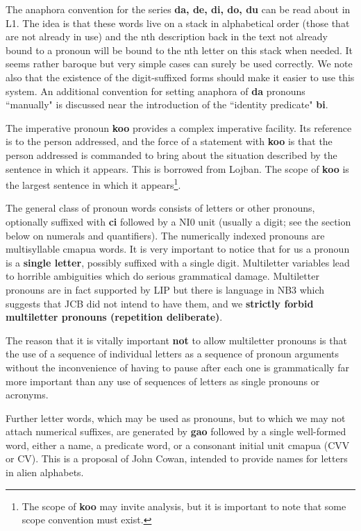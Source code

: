 \documentclass[12pt]{book}
\begin{document}
The anaphora convention for the series {\bf da, de, di, do, du} can be read about in L1.  The idea is that these words live on a stack in alphabetical order (those that are not already in use) and the nth description back in the text not already bound to a pronoun will be bound to the nth letter on this stack when needed.   It seems rather baroque but very simple cases can surely be used correctly.  We note also that the existence of the digit-suffixed forms should make it easier to use this system.  An additional convention for setting anaphora of {\bf da} pronouns ``manually" is discussed near the introduction of the ``identity predicate" {\bf bi}.

The imperative pronoun {\bf koo} provides a complex imperative facility.  Its reference is to the person addressed, and the force of a statement with {\bf koo} is that the person addressed is commanded to bring about the situation described by the sentence in which it appears.  This is borrowed from Lojban.  The scope of {\bf koo} is the largest sentence in which it appears\footnote{The scope of {\bf koo} may invite analysis, but it is important to note that some scope convention must exist.}.

The general class of pronoun words consists of letters or other pronouns, optionally suffixed with {\bf ci} followed by a NI0 unit (usually a digit; see the section below on numerals and quantifiers).     The numerically indexed pronouns are multisyllable cmapua words.  It is very important
to notice that for us a pronoun is a {\bf single letter}, possibly suffixed with a single digit.  Multiletter variables lead to horrible ambiguities which do serious grammatical damage.
Multiletter pronouns are in fact supported by LIP but there is language in NB3 which suggests that JCB did not intend to have them, and we {\bf strictly forbid multiletter pronouns (repetition deliberate)}.

The reason that it is vitally important {\bf not} to allow multiletter pronouns is that the use of a sequence of individual letters as a sequence of pronoun arguments without the inconvenience of having to pause after each one is grammatically far more important than any use of sequences of letters as single pronouns or acronyms.

Further letter words, which may be used as pronouns, but to which we may not attach numerical suffixes, are generated by {\bf gao} followed by a single well-formed word, either a name, a predicate word, or a consonant initial unit cmapua (CVV or CV).
This is a proposal of John Cowan, intended to provide names for letters in alien alphabets.
\end{document}
